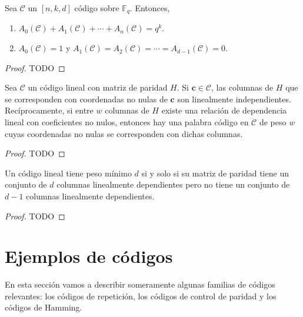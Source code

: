 \begin{theorem}
  Sea \(\mathcal C\) un \([n,k,d]\) código sobre \(\mathbb F_q\).
  Entonces, \begin{enumerate}
    \item \(A_0(\mathcal C) + A_1(\mathcal C) + \cdots + A_n(\mathcal C) = q^k\).
    \item \(A_0(\mathcal C) = 1\) y \(A_1(\mathcal C) = A_2(\mathcal C) = \cdots = A_{d-1}(\mathcal C) = 0\).
  \end{enumerate}
\end{theorem}

\begin{proof}
  TODO
\end{proof}


\begin{theorem}
  Sea \(\mathcal C\) un código lineal con matriz de paridad \(H\). Si \(\symbf{c} \in \mathcal C\), las columnas de \(H\) que se corresponden con coordenadas no nulas de \(\symbf{c}\) son linealmente independientes.
  Recíprocamente, si entre \(w\) columnas de \(H\) existe una relación de dependencia lineal con coeficientes no nulos, entonces hay una palabra código en \(\mathcal C\) de peso \(w\) cuyas coordenadas no nulas se corresponden con dichas columnas.
\end{theorem}

\begin{proof}
  TODO
\end{proof}

\begin{corollary}
  \label{cor:peso-minimo-columnas-dependientes}
  Un código lineal tiene peso mínimo \(d\) si y solo si su matriz de paridad tiene un conjunto de \(d\) columnas linealmente dependientes pero no tiene un conjunto de \(d-1\) columnas linealmente dependientes.
\end{corollary}

\begin{proof}
  TODO
\end{proof}

\section{Ejemplos de códigos}

En esta sección vamos a describir someramente algunas familias de códigos relevantes: los códigos de repetición, los códigos de control de paridad y los códigos de Hamming.

